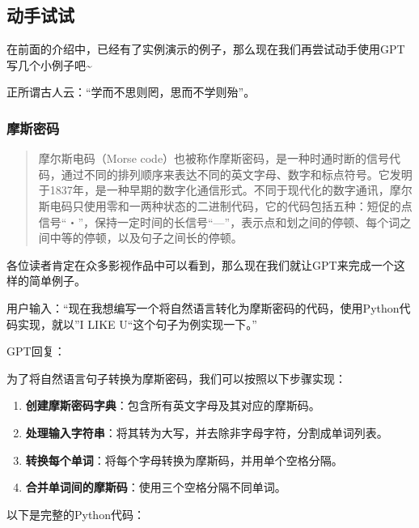 \hypertarget{ux52a8ux624bux8bd5ux8bd5}{%
\subsection{动手试试}\label{ux52a8ux624bux8bd5ux8bd5}}

在前面的介绍中，已经有了实例演示的例子，那么现在我们再尝试动手使用GPT写几个小例子吧\textasciitilde{}

正所谓古人云：``学而不思则罔，思而不学则殆''。

\hypertarget{ux6469ux65afux5bc6ux7801}{%
\subsubsection{摩斯密码}\label{ux6469ux65afux5bc6ux7801}}

\begin{quote}
摩尔斯电码（Morse
code）也被称作摩斯密码，是一种时通时断的信号代码，通过不同的排列顺序来表达不同的英文字母、数字和标点符号。它发明于1837年，是一种早期的数字化通信形式。不同于现代化的数字通讯，摩尔斯电码只使用零和一两种状态的二进制代码，它的代码包括五种：短促的点信号``・''，保持一定时间的长信号``---''，表示点和划之间的停顿、每个词之间中等的停顿，以及句子之间长的停顿。
\end{quote}

各位读者肯定在众多影视作品中可以看到，那么现在我们就让GPT来完成一个这样的简单例子。

用户输入：``现在我想编写一个将自然语言转化为摩斯密码的代码，使用Python代码实现，就以''I
LIKE U``这个句子为例实现一下。''

GPT回复：

为了将自然语言句子转换为摩斯密码，我们可以按照以下步骤实现：

\begin{enumerate}
\def\labelenumi{\arabic{enumi}.}
\item
  \textbf{创建摩斯密码字典}：包含所有英文字母及其对应的摩斯码。
\item
  \textbf{处理输入字符串}：将其转为大写，并去除非字母字符，分割成单词列表。
\item
  \textbf{转换每个单词}：将每个字母转换为摩斯码，并用单个空格分隔。
\item
  \textbf{合并单词间的摩斯码}：使用三个空格分隔不同单词。
\end{enumerate}

以下是完整的Python代码：

